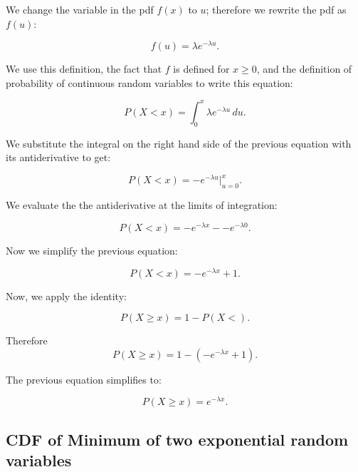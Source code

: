 \documentclass[a5paper,11pt]{article}
\begin{document}
We change the variable in the pdf $f\left(x \right)$ to $u$; therefore we
rewrite the pdf as $f\left( u \right)$:

\begin{equation}
f\left(u \right) = \lambda e^{-\lambda u}.
\end{equation}

We use this definition, the fact that $f$ is defined for $x \geq 0$, and the 
definition of probability of continuous random variables \cite{reading5b} to 
write this equation:

\begin{equation}
P\left(X < x \right) = \int_0^x \lambda e^{-\lambda u} \,du.
\end{equation}

We substitute the integral on the right hand side of the previous equation 
with its antiderivative to get:

\begin{equation}
P\left(X < x \right) = -e^{-\lambda u} \bigg\rvert_{u=0}^x.
\end{equation}

We evaluate the the antiderivative at the limits of integration:

\begin{equation}
P\left(X < x \right) = -e^{-\lambda x} - -e^{-\lambda 0}.
\end{equation}

Now we simplify the previous equation:

\begin{equation}
P\left(X < x \right) = -e^{-\lambda x} + 1.
\end{equation}

Now, we apply the identity:

\begin{equation}
P\left(X \geq x \right) = 1 - P\left(X < \right).
\end{equation}

Therefore
\begin{equation}
P\left(X \geq x \right) = 1 - \left( -e^{-\lambda x} + 1 \right).
\end{equation}

The previous equation simplifies to:

\begin{equation}
P\left(X \geq x \right) = e^{-\lambda x}.
\end{equation}

\subsection{CDF of Minimum of two exponential random variables}
\end{document}
